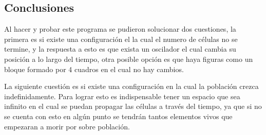 \subsection{Conclusiones}
	Al hacer y probar este programa se pudieron solucionar dos cuestiones, la primera es si existe una configuración el la cual el numero de células no se termine, y la respuesta a esto es que exista un oscilador el cual cambia su posición a lo largo del tiempo, otra posible opción es que haya figuras como un bloque formado por 4 cuadros en el cual no hay cambios.

	La siguiente cuestión es si existe una configuración en la cual la población crezca indefinidamente. Para lograr esto es indispensable tener un espacio que sea infinito en el cual se puedan propagar las células a través del tiempo, ya que si no se cuenta con esto en algún punto se tendrán tantos elementos vivos que empezaran a morir por sobre población.